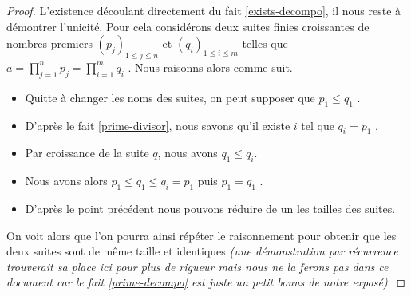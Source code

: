 \begin{proof}
	L'existence découlant directement du fait \ref{exists-decompo}, il nous reste à démontrer l'unicité.
	Pour cela considérons deux suites finies croissantes de nombres premiers
	$(p_j)_{1 \leq j \leq n}$
	et
	$(q_i)_{1 \leq i \leq m}$
	telles que $\displaystyle a = \prod_{j=1}^{n} p_j = \prod_{i=1}^{m} q_i$ .
	Nous raisonns alors comme suit.
	
	\begin{itemize}[label=\small\textbullet]
		\item Quitte à changer les noms des suites, on peut supposer que $p_1 \leq q_1$ .
		

		\item D'après le fait \ref{prime-divisor}, nous savons qu'il existe $i$ tel que $q_i = p_1$ .
	
		\item Par croissance de la suite $q$, nous avons $q_1 \leq q_i$.
		
		\item Nous avons alors $p_1 \leq q_1 \leq q_i = p_1$ puis $p_1 = q_1$ .
		
		\item D'après le point précédent nous pouvons réduire de un les tailles des suites.
	\end{itemize}
	
	On voit alors que l'on pourra ainsi répéter le raisonnement pour obtenir que les deux suites sont de même taille et identiques \emph{(une démonstration par récurrence trouverait sa place ici pour plus de rigueur mais nous ne la ferons pas dans ce document car le fait \ref{prime-decompo} est juste un petit bonus de notre exposé)}.
\end{proof}
